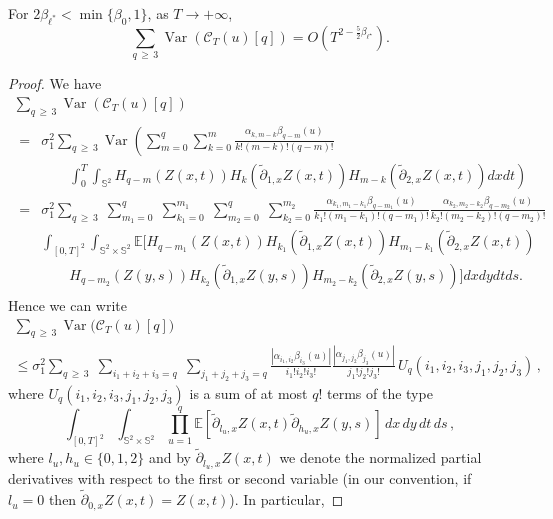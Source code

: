 \documentclass[10pt]{amsart}
\theoremstyle{definition}\newtheorem{defi}[theo]{Definition}\newtheorem{rema}[theo]{Remark}\newtheorem{exam}[theo]{Example}\newtheorem{exem}[theo]{Example}\newtheorem{nota}[theo]{Notation}
\newcommand{\clC}{\mathcal{C}}
\newcommand{\bbS}{\mathbb{S}}
\newcommand{\bbE}{\mathbb{E}}
\DeclareMathOperator{\Var}{Var}
\begin{document}
\begin{prop}\label{var-higher-chaoses}
For $2\beta_{\ell^*} < \min\{ \beta_0, 1\}$, as $T\to +\infty$,
\begin{equation*}
\sum_{q\,\geq\,3}\Var(\clC_{T}(u)[q])=O\left(T^{2-\frac52
\beta _{\ell ^{\star }}}\right).
\end{equation*}
\end{prop}

\begin{proof}
We have
\begin{multline*}
\sum_{q\,\geq\,3}\Var(\clC_{T}(u)[q]) \\
\begin{aligned}
=&\sigma _{1}^{2}\sum_{q\,\geq\,3}\Var\left(
\sum_{m=0}^{q}\sum_{k=0}^{m}\frac{\alpha _{k,m-k}\beta _{q-m}(u)}{k!(m-k)!(q-m)!}\right.\\
&\qquad\left.\int_{0}^{T}\int_{\bbS^{2}}H_{q-m}(Z(x,t))H_{k}\left(
\widetilde{\partial }_{1,x}Z(x,t)\right)H_{m-k}\left(\widetilde{\partial } _{2,x}Z(x,t)\right)dxdt\right) \\
=&\sigma _{1}^{2}\sum_{q\,\geq\,3}\;\sum_{m_{1}=0}^{q}\;\sum_{k_{1}=0}^{m_{1}}\;\sum_{m_{2}=0}^{q}\;
\sum_{k_{2}=0}^{m_{2}}\frac{\alpha _{k_{1},m_{1}-k_{1}}\beta _{q-m_{1}}(u)}{ k_{1}!(m_{1}-k_{1})!(q-m_{1})!}\frac{\alpha _{k_{2},m_{2}-k_{2}}\beta _{q-m_{2}}(u)}{k_{2}!\left(m_{2}-k_{2}\right)!\left(q-m_{2}\right)!} \\
& \int_{[0,T]^{2}}\int_{\bbS^{2}\times \bbS^{2}}
\bbE\bigg[H_{q-m_{1}}(Z(x,t))H_{k_{1}}\left(\widetilde{\partial } _{1,x}Z(x,t)\right)H_{m_{1}-k_{1}}\left(\widetilde{\partial }_{2,x}Z(x,t)\right) \\
&\qquad H_{q-m_{2}}(Z(y,s))H_{k_{2}}\left(\widetilde{\partial}_{1,x}Z(y,s)\right)H_{m_{2}-k_{2}}\left(\widetilde{\partial}_{2,x}Z(y,s)\right)
\bigg] dxdydtds.
\end{aligned}
\end{multline*}
Hence we can write
\begin{multline*}
\sum_{q\,\geq\,3}\Var\big(\clC_{T}(u)[q]\big)\\
\leq \sigma _{1}^{2}\sum_{q\,\geq\,3}\;\sum_{i_{1}+i_{2}+i_{3}=q}\;\sum_{j_{1}+j_{2}+j_{3}=q}\frac{\left|\alpha _{i_{1},i_{2}}\beta _{i_{3}}(u)\right|}{i_{1}!i_{2}!i_{3}!}\frac{\left|\alpha _{j_{1},j_{2}}\beta _{j_{3}}(u)\right|}{j_{1}!j_{2}!j_{3}!}
\,U_{q}\left(i_{1},i_{2},i_{3},j_{1},j_{2},j_{3}\right)\,,
\end{multline*}
where $U_{q}(i_{1},i_{2},i_{3},j_{1},j_{2},j_{3})$ is a sum of at most $q!$ terms of the type
\begin{equation}
\int_{[0,T]^{2}}\int_{\bbS^{2}\times \bbS ^{2}}\prod_{u=1}^{q}\bbE\left[\widetilde{\partial }_{l_{u},x}Z(x,t)
\widetilde{\partial }_{h_{u},x}Z(y,s)\right] \,dx\,dy\,dt\,ds\,,
\end{equation}
where $l_{u},h_{u}\in \{0,1,2\}$ and by $\widetilde{\partial } _{l_{u},x}Z(x,t)$ we denote the normalized partial derivatives with respect to the first or second variable (in our convention, if $l_u=0$ then $
\widetilde{\partial }_{0,x}Z(x,t)=Z(x,t)$). In particular,


\end{proof}
\end{document}
